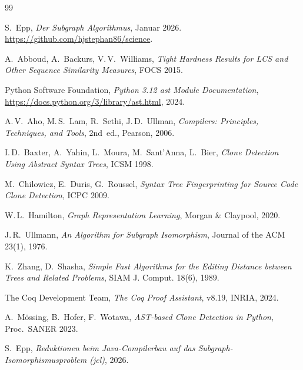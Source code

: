 ﻿\documentclass[a4paper,12pt]{article}
\theoremstyle{definition}
\begin{document}
\begin{thebibliography}{99}

S.~Epp, \textit{Der Subgraph Algorithmus}, Januar 2026.
\url{https://github.com/hjstephan86/science}.

A.~Abboud, A.~Backurs, V.\,V.~Williams,
\textit{Tight Hardness Results for LCS and Other Sequence
Similarity Measures}, FOCS 2015.

Python Software Foundation,
\textit{Python 3.12 ast Module Documentation},
\url{https://docs.python.org/3/library/ast.html}, 2024.

A.\,V.~Aho, M.\,S.~Lam, R.~Sethi, J.\,D.~Ullman,
\textit{Compilers: Principles, Techniques, and Tools},
2nd~ed., Pearson, 2006.

I.\,D.~Baxter, A.~Yahin, L.~Moura, M.~Sant'Anna, L.~Bier,
\textit{Clone Detection Using Abstract Syntax Trees},
ICSM 1998.

M.~Chilowicz, E.~Duris, G.~Roussel,
\textit{Syntax Tree Fingerprinting for Source Code Clone
Detection}, ICPC 2009.

W.\,L.~Hamilton,
\textit{Graph Representation Learning},
Morgan \& Claypool, 2020.

J.\,R.~Ullmann,
\textit{An Algorithm for Subgraph Isomorphism},
Journal of the ACM 23(1), 1976.

K.~Zhang, D.~Shasha,
\textit{Simple Fast Algorithms for the Editing Distance between
Trees and Related Problems}, SIAM J. Comput. 18(6), 1989.

The Coq Development Team,
\textit{The Coq Proof Assistant}, v8.19, INRIA, 2024.

A.~M\"ossing, B.~Hofer, F.~Wotawa,
\textit{AST-based Clone Detection in Python},
Proc.\ SANER 2023.

S.~Epp, \textit{Reduktionen beim Java-Compilerbau auf das
Subgraph-Isomorphismusproblem (jcl)}, 2026.

\end{thebibliography}
\end{document}

